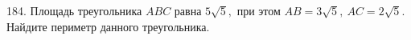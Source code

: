 184. Площадь треугольника $ABC$ равна $5\sqrt{5},$ при этом $AB=3\sqrt{5},\ AC=2\sqrt{5}.$ Найдите периметр данного треугольника.\\
